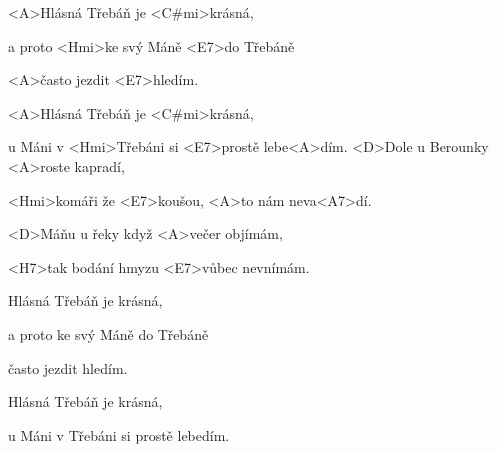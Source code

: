 
\zr
<A>Hlásná Třebáň je <C#mi>krásná,

a proto <Hmi>ke svý Máně <E7>do Třebáně

<A>často jezdit <E7>hledím.

<A>Hlásná Třebáň je <C#mi>krásná,

u Máni v <Hmi>Třebáni si <E7>prostě lebe<A>dím.
\kr
\zs
<D>Dole u Berounky <A>roste kapradí,

<Hmi>komáři že <E7>koušou, <A>to nám neva<A7>dí.

<D>Máňu u řeky když <A>večer objímám,

<H7>tak bodání hmyzu <E7>vůbec nevnímám. \ks

\zr
Hlásná Třebáň je krásná,

a proto ke svý Máně do Třebáně 

často jezdit hledím. 

Hlásná Třebáň je krásná, 

u Máni v Třebáni si prostě lebedím.
\kr
\kp
